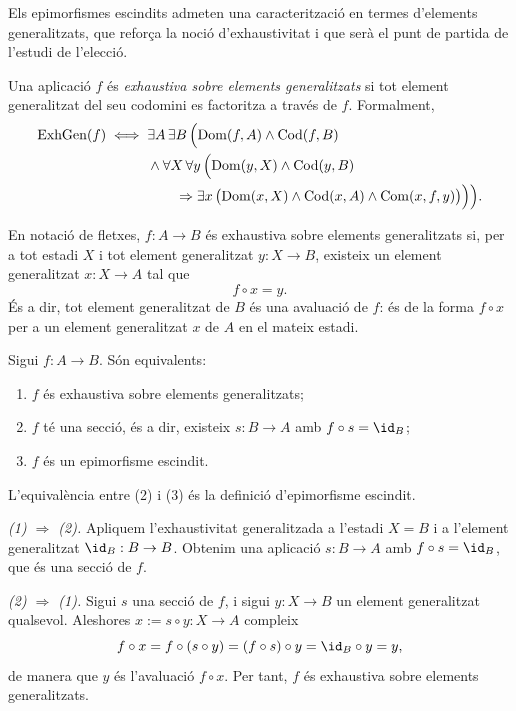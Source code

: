 Els epimorfismes escindits admeten una caracterització en termes d'elements generalitzats, que reforça la noció d'exhaustivitat i que serà el punt de partida de l'estudi de l'elecció.

\begin{definicio}\label{def:exhaustiva-generalitzada}
Una aplicació \(f\) és \emph{exhaustiva sobre elements generalitzats} si tot element generalitzat del seu codomini es factoritza a través de \(f\). Formalment,
\[
\begin{aligned}
\operatorname{ExhGen}(f)
\iff {}&
\exists A\,\exists B\,\Bigl(
\operatorname{Dom}(f,A)\land\operatorname{Cod}(f,B)
\\
&{}\land
\forall X\,\forall y\,\Bigl(
\operatorname{Dom}(y,X)\land\operatorname{Cod}(y,B)
\\
&\qquad{}\Rightarrow
\exists x\,\bigl(\operatorname{Dom}(x,X)\land\operatorname{Cod}(x,A)\land\operatorname{Com}(x,f,y)\bigr)
\Bigr)
\Bigr).
\end{aligned}
\]
\end{definicio}

\begin{notacio}\label{not:exhaustiva-generalitzada}
En notació de fletxes, \(f:A\to B\) és exhaustiva sobre elements generalitzats si, per a tot estadi \(X\) i tot element generalitzat \(y:X\to B\), existeix un element generalitzat \(x:X\to A\) tal que
\[
f\circ x=y.
\]
És a dir, tot element generalitzat de \(B\) és una avaluació de \(f\): és de la forma \(f\circ x\) per a un element generalitzat \(x\) de \(A\) en el mateix estadi.
\end{notacio}

\begin{proposicio}\label{prop:exhaustiva-generalitzada-escindit}
Sigui \(f:A\to B\). Són equivalents:
\begin{enumerate}
\item \(f\) és exhaustiva sobre elements generalitzats;
\item \(f\) té una secció, és a dir, existeix \(s:B\to A\) amb \(f\circ s=\id_B\);
\item \(f\) és un epimorfisme escindit.
\end{enumerate}
\end{proposicio}

\begin{prova}
L'equivalència entre (2) i (3) és la definició d'epimorfisme escindit.

\emph{(1) \(\Rightarrow\) (2).} Apliquem l'exhaustivitat generalitzada a l'estadi \(X=B\) i a l'element generalitzat \(\id_B:B\to B\). Obtenim una aplicació \(s:B\to A\) amb \(f\circ s=\id_B\), que és una secció de \(f\).

\emph{(2) \(\Rightarrow\) (1).} Sigui \(s\) una secció de \(f\), i sigui \(y:X\to B\) un element generalitzat qualsevol. Aleshores \(x:=s\circ y:X\to A\) compleix
\[
f\circ x=f\circ(s\circ y)=(f\circ s)\circ y=\id_B\circ y=y,
\]
de manera que \(y\) és l'avaluació \(f\circ x\). Per tant, \(f\) és exhaustiva sobre elements generalitzats.
\end{prova}

